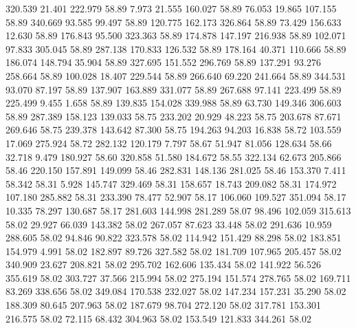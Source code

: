  320.539   21.401  222.979        58.89
   7.973   21.555  160.027        58.89
  76.053   19.865  107.155        58.89
 340.669   93.585   99.497        58.89
 120.775  162.173  326.864        58.89
  73.429  156.633   12.630        58.89
 176.843   95.500  323.363        58.89
 174.878  147.197  216.938        58.89
 102.071   97.833  305.045        58.89
 287.138  170.833  126.532        58.89
 178.164   40.371  110.666        58.89
 186.074  148.794   35.904        58.89
 327.695  151.552  296.769        58.89
 137.291   93.276  258.664        58.89
 100.028   18.407  229.544        58.89
 266.640   69.220  241.664        58.89
 344.531   93.070   87.197        58.89
 137.907  163.889  331.077        58.89
 267.688   97.141  223.499        58.89
 225.499    9.455    1.658        58.89
 139.835  154.028  339.988        58.89
  63.730  149.346  306.603        58.89
 287.389  158.123  139.033        58.75
 233.202   20.929   48.223        58.75
 203.678   87.671  269.646        58.75
 239.378  143.642   87.300        58.75
 194.263   94.203   16.838        58.72
 103.559   17.069  275.924        58.72
 282.132  120.179    7.797        58.67
  51.947   81.056  128.634        58.66
  32.718    9.479  180.927        58.60
 320.858   51.580  184.672        58.55
 322.134   62.673  205.866        58.46
 220.150  157.891  149.099        58.46
 282.831  148.136  281.025        58.46
 153.370    7.411   58.342        58.31
   5.928  145.747  329.469        58.31
 158.657   18.743  209.082        58.31
 174.972  107.180  285.882        58.31
 233.390   78.477   52.907        58.17
 106.060  109.527  351.094        58.17
  10.335   78.297  130.687        58.17
 281.603  144.998  281.289        58.07
  98.496  102.059  315.613        58.02
  29.927   66.039  143.382        58.02
 267.057   87.623   33.448        58.02
 291.636   10.959  288.605        58.02
  94.846   90.822  323.578        58.02
 114.942  151.429   88.298        58.02
 183.851  154.979    4.991        58.02
 182.897   89.726  327.582        58.02
 181.709  107.965  205.457        58.02
 340.909   23.627  208.821        58.02
 295.702  162.606  135.434        58.02
 141.922   56.526  355.619        58.02
 303.727   37.566  215.994        58.02
 275.194  151.574  278.765        58.02
 169.711   83.269  338.656        58.02
 349.084  170.538  232.027        58.02
 147.234  157.231   35.290        58.02
 188.309   80.645  207.963        58.02
 187.679   98.704  272.120        58.02
 317.781  153.301  216.575        58.02
  72.115   68.432  304.963        58.02
 153.549  121.833  344.261        58.02
